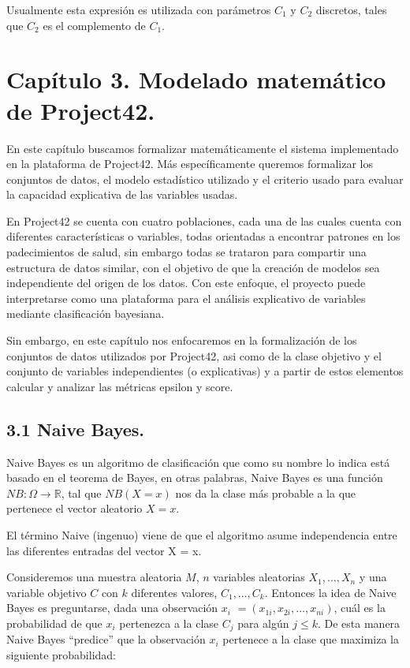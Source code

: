 \documentclass[
 12pt,
 letterpaper,
]{article}
\theoremstyle{teoremaBreak}
\theoremstyle{plain}
\theoremstyle{definition}
\begin{document}
Usualmente esta expresión es utilizada con parámetros $C_1$ y $C_2$ discretos,
tales que $C_2$ es el complemento de $C_1$.

\section{Capítulo 3. Modelado matemático de
Project42.}\label{capuxedtulo-3.-modelado-matemuxe1tico-de-project42.}

En este capítulo buscamos formalizar matemáticamente el sistema
implementado en la plataforma de Project42. Más específicamente queremos
formalizar los conjuntos de datos, el modelo estadístico utilizado y el
criterio usado para evaluar la capacidad explicativa de las variables
usadas.

En Project42 se cuenta con cuatro poblaciones, cada una de las cuales
cuenta con diferentes características o variables, todas orientadas a
encontrar patrones en los padecimientos de salud, sin embargo todas se
trataron para compartir una estructura de datos similar, con el objetivo
de que la creación de modelos sea independiente del origen de los datos.
Con este enfoque, el proyecto puede interpretarse como una plataforma
para el análisis explicativo de variables mediante clasificación
bayesiana.

Sin embargo, en este capítulo nos enfocaremos en la formalización de los
conjuntos de datos utilizados por Project42, asi como de la clase
objetivo y el conjunto de variables independientes (o explicativas) y a
partir de estos elementos calcular y analizar las métricas epsilon y
score.

\subsection{3.1 Naive Bayes.}\label{naive-bayes.}

Naive Bayes es un algoritmo de clasificación que como su nombre lo
indica está basado en el teorema de Bayes, en otras palabras, Naive
Bayes es una función $NB: \Omega \to \mathbb{R}$, tal que $NB(X = x)$ nos
da la clase más probable a la que pertenece el vector aleatorio $X = x$.

El término Naive (ingenuo) viene de que el algoritmo asume independencia
entre las diferentes entradas del vector X = x.

Consideremos una muestra aleatoria $M$, $n$ variables aleatorias $X_1, \ldots,
X_n$ y una variable objetivo $C$ con $k$ diferentes valores, $C_1, \ldots, C_k$.
Entonces la idea de Naive Bayes es preguntarse, dada una observación $x_i$
$= (x_{1i}, x_{2i}, \ldots, x_{ni})$, cuál es la probabilidad de que $x_i$ pertenezca
a la clase $C_j$ para algún $j \le k$. De esta manera Naive Bayes
``predice'' que la observación $x_i$ pertenece a la clase que maximiza la
siguiente probabilidad:
\end{document}
